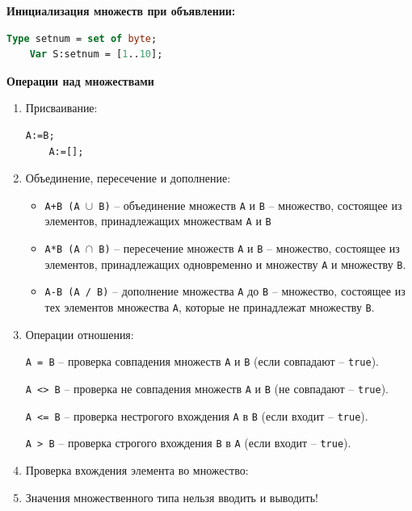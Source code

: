 \noindent
{\bf{Инициализация множеств при объявлении:}}
\begin{lstlisting}[language=Pascal]
	Type setnum = set of byte;
	Var S:setnum = [1..10]; 
\end{lstlisting}

\noindent
{\bf{Операции над множествами}}
\begin{enumerate}
\item Присваивание:
\begin{lstlisting}[language=Pascal]
    A:=B;
    A:=[];
\end{lstlisting}
\item Объединение, пересечение и дополнение:

\begin{itemize}
\item \texttt{A+B (A $\cup$ B)} – объединение  множеств \texttt{A} и \texttt{B} – множество, состоящее из элементов, принадлежащих множествам \texttt{A} и \texttt{B}
\item \texttt{A*B (A $\cap$ B)} – пересечение множеств \texttt{A} и \texttt{B} – множество, состоящее из элементов, принадлежащих одновременно и множеству \texttt{A} и  множеству \texttt{B}.
\item \texttt{A-B (A / B)} – дополнение  множества \texttt{A} до \texttt{B} – множество, состоящее 	из тех элементов множества \texttt{A}, которые не принадлежат  множеству \texttt{B}.
\end{itemize}


\item Операции отношения:

\texttt{A = B} – проверка совпадения множеств \texttt{A} и \texttt{B} (если совпадают – \texttt{true}).

\texttt{A <> B} – проверка не совпадения множеств \texttt{A} и \texttt{B} (не совпадают – \texttt{true}).

\texttt{A <= B} – проверка нестрогого вхождения \texttt{A} в \texttt{B} (если входит – \texttt{true}).

\texttt{A > B} – проверка строгого вхождения \texttt{B} в \texttt{A} (если входит – \texttt{true}). 

\item Проверка вхождения элемента во множество:
 
\item Значения множественного типа нельзя вводить и выводить!

\end{enumerate}

